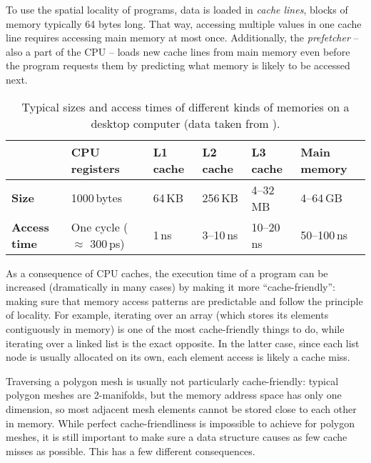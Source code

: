 To use the spatial locality of programs, data is loaded in \emph{cache lines}, blocks of memory typically 64 bytes long.
That way, accessing multiple values in one cache line requires accessing main memory at most once.
Additionally, the \emph{prefetcher} -- also a part of the CPU -- loads new cache lines from main memory even before the program requests them by predicting what memory is likely to be accessed next.

\begin{table}[t]
  \centering
  \sffamily
  \renewcommand{\arraystretch}{1.1}
  \begin{tabular}{llllll}
  & \textbf{CPU registers} & \textbf{L1 cache} & \textbf{L2 cache} & \textbf{L3 cache} & \textbf{Main memory} \\\hline
  \textbf{Size} & 1000\,bytes & 64\,KB & 256\,KB & 4--32\,MB & 4--64\,GB \\\hdashline[.4mm/1mm]
  \textbf{Access time} & One cycle ($\approx$ 300\,ps) & 1\,ns & 3--10\,ns & 10--20\,ns & 50--100\,ns \\
  \end{tabular}
  \renewcommand{\arraystretch}{1.0}
  \caption{Typical sizes and access times of different kinds of memories on a desktop computer (data taken from \cite{hennessy2017computer}).}
  \label{tbl:caches}
  \vspace{5mm}
\end{table}

As a consequence of CPU caches, the execution time of a program can be increased (dramatically in many cases) by making it more \enquote{cache-friendly}: making sure that memory access patterns are predictable and follow the principle of locality.
For example, iterating over an array (which stores its elements contiguously in memory) is one of the most cache-friendly things to do, while iterating over a linked list is the exact opposite.
In the latter case, since each list node is usually allocated on its own, each element access is likely a cache miss.

Traversing a polygon mesh is usually not particularly cache-friendly:
typical polygon meshes are 2-manifolds, but the memory address space has only one dimension, so most adjacent mesh elements cannot be stored close to each other in memory.
While perfect cache-friendliness is impossible to achieve for polygon meshes, it is still important to make sure a data structure causes as few cache misses as possible.
This has a few different consequences.

